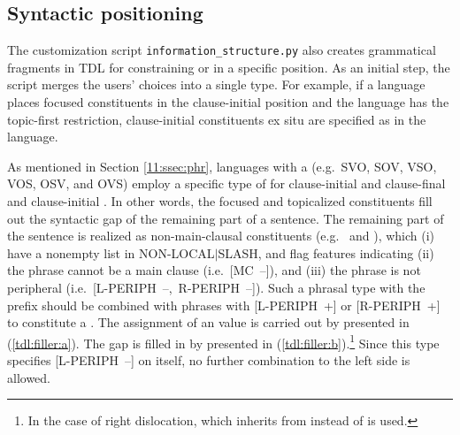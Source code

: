 \subsection{Syntactic positioning}
\label{11:ssec:ph}



The customization script \texttt{information\_structure.py} also
creates grammatical fragments in TDL for constraining  or 
in a specific position. As an initial step, the script merges the
users' choices into a single type. For example, if a language places
focused constituents in the clause-initial position and the language
has the topic-first restriction, clause-initial constituents
ex situ are specified as  in the
language.



As mentioned in Section \ref{11:ssec:phr}, languages with a  (e.g.\ SVO, SOV, VSO, VOS, OSV, and OVS) employ a specific
type of  for clause-initial and clause-final
 and clause-initial
. In other words, the
focused and topicalized constituents fill out the syntactic gap of the
remaining part of a sentence. The remaining part of the sentence is
realized as non-main-clausal constituents
(e.g.\  and ),
which (i) have a nonempty list in NON-LOCAL{$\mid$}SLASH, and flag
features indicating (ii) the phrase cannot be a main clause
(i.e.\ \mbox{[MC --]}), and (iii) the phrase is not peripheral
(i.e.\ \mbox{[L-PERIPH --, R-PERIPH
    --]}). Such a phrasal type
with the  prefix should be combined with phrases with
\mbox{[L-PERIPH +]} or \mbox{[R-PERIPH +]} to constitute a
.  The assignment of an 
value is carried out by  presented in
(\ref{tdl:filler:a}). The gap is filled in by
 presented in
(\ref{tdl:filler:b}).\footnote{In the case of right dislocation,
   which inherits from
   instead of  is
  used.} Since this type specifies \mbox{[L-PERIPH --]} on itself, no
further combination to the left side is allowed.








